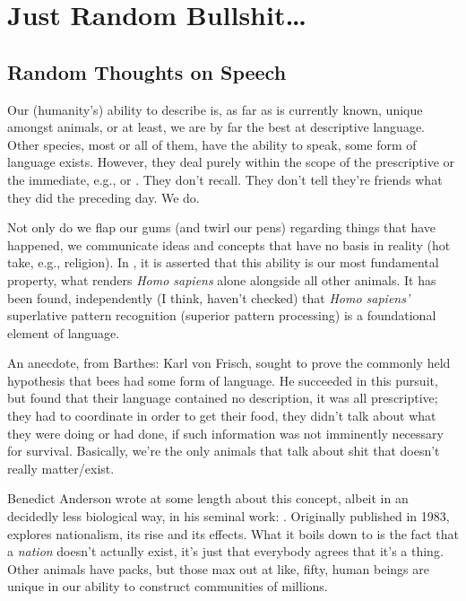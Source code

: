 \documentclass[../butidigress.tex]{subfiles}
\begin{document}
\chapter{Just Random Bullshit\ldots}
\newpage

\section{Random Thoughts on Speech}
Our (humanity's) ability to describe is, as far as is currently known, unique amongst animals, or at least, we are by far the best at descriptive language.
Other species, most or all of them, have the ability to speak, some form of language exists.
However, they deal purely within the scope of the prescriptive or the immediate, e.g.,  or .
They don't recall.
They don't tell they're friends what they did the preceding day.
We do.

Not only do we flap our gums (and twirl our pens) regarding things that have happened, we communicate ideas and concepts that have no basis in reality (hot take, e.g., religion). In , it is asserted that this ability is our most fundamental property, what renders \emph{Homo sapiens} alone alongside all other animals.
It has been found, independently (I think, haven't checked) that \emph{Homo sapiens'} superlative pattern recognition (superior pattern processing) is a foundational element of language.

An anecdote, from Barthes: Karl von Frisch, sought to prove the commonly held hypothesis that bees had some form of language.
He succeeded in this pursuit, but found that their language contained no description, it was all prescriptive; they had to coordinate in order to get their food, they didn't talk about what they were doing or had done, if such information was not imminently necessary for survival.
Basically, we're the only animals that talk about shit that doesn't really matter/exist.

Benedict Anderson wrote at some length about this concept, albeit in an decidedly less biological way, in his seminal work: .
Originally published in 1983,  explores nationalism, its rise and its effects.
What it boils down to is the fact that a \emph{nation} doesn't actually exist, it's just that everybody agrees that it's a thing\autocite{imaginedcommunities}.
Other animals have packs, but those max out at like, fifty, human beings are unique in our ability to construct communities of millions.
\end{document}
